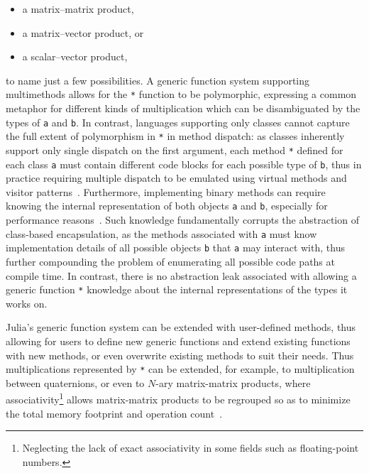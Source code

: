 \documentclass[pldi]{sigplanconf-pldi15}
\begin{document}
\begin{itemize}
	\item a matrix--matrix product,
	\item a matrix--vector product, or
	\item a scalar--vector product,
\end{itemize}
%
to name just a few possibilities. A generic function system supporting
multimethods allows for the \verb|*| function to be polymorphic, expressing a
common metaphor for different kinds of multiplication which can be
disambiguated by the types of \verb|a| and \verb|b|. In contrast, languages
supporting only classes cannot capture the full extent of polymorphism in
\verb|*| in method dispatch: as classes inherently support only single dispatch
on the first argument, each method \verb|*| defined for each class \verb|a|
must contain different code blocks for each possible type of \verb|b|, thus in
practice requiring multiple dispatch to be emulated using virtual methods and
visitor patterns~\cite{designpatterns}. Furthermore, implementing binary methods can
require knowing the internal representation of both objects \verb|a| and
\verb|b|, especially for performance reasons~\cite{Bruce1995}. Such knowledge
fundamentally corrupts the abstraction of class-based encapsulation, as the
methods associated with \verb|a| must know implementation details of all
possible objects \verb|b| that \verb|a| may interact with, thus further
compounding the problem of enumerating all possible code paths at compile time.
In contrast, there is no abstraction leak associated with allowing a generic
function \verb|*| knowledge about the internal representations of the types it
works on.

Julia's generic function system can be extended with user-defined methods, thus
allowing for users to define new generic functions and extend existing
functions with new methods, or even overwrite existing methods to suit their
needs. Thus multiplications represented by \verb|*| can be extended, for
example, to multiplication between quaternions, or even to $N$-ary
matrix-matrix products, where associativity\footnote{Neglecting the lack of
exact associativity in some fields such as floating-point numbers.} allows
matrix-matrix products to be regrouped so as to minimize the total memory
footprint and operation count~\cite{Hu1984}.
\end{document}
